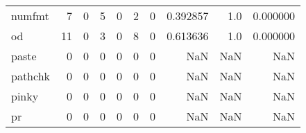 \begin{tabular}{lrrrrrrrrr}
numfmt    &                                       7 &                                                  0 &                                                  5 &                                                  0 &                                                  2 &                                                  0 &                                           0.392857 &                                    1.0 &                             0.000000 \\
od        &                                      11 &                                                  0 &                                                  3 &                                                  0 &                                                  8 &                                                  0 &                                           0.613636 &                                    1.0 &                             0.000000 \\
paste     &                                       0 &                                                  0 &                                                  0 &                                                  0 &                                                  0 &                                                  0 &                                                NaN &                                    NaN &                                  NaN \\
pathchk   &                                       0 &                                                  0 &                                                  0 &                                                  0 &                                                  0 &                                                  0 &                                                NaN &                                    NaN &                                  NaN \\
pinky     &                                       0 &                                                  0 &                                                  0 &                                                  0 &                                                  0 &                                                  0 &                                                NaN &                                    NaN &                                  NaN \\
pr        &                                       0 &                                                  0 &                                                  0 &                                                  0 &                                                  0 &                                                  0 &                                                NaN &                                    NaN &                                  NaN \\

\end{tabular}
